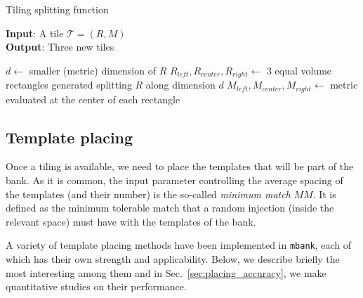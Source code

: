 \documentclass[twocolumn,showpacs,preprintnumbers,nofootinbib,prd,
superscriptaddress,10pt]{revtex4-2}
\begin{document}
\begin{algorithm}[H]
	\centering
	\caption{Tiling splitting function}\label{alg:tiling}
	\flushleft
	\hspace*{\algorithmicindent} \textbf{Input}: A tile $\mathcal{T} = \left(R, M\right)$ \\
	\hspace*{\algorithmicindent} \textbf{Output}: Three new tiles
	\begin{algorithmic}
		\State $d \gets $ smaller (metric) dimension of $R$
		\State $R_{left}, R_{center}, R_{right} \gets $ 3 equal volume rectangles generated splitting $R$ along dimension $d$ 
		\State $M_{left}, M_{center}, M_{right} \gets $ metric evaluated at the center of each rectangle
		\State{}
		\EndProcedure
	\end{algorithmic}
\end{algorithm}


\subsection{Template placing} \label{sec:template_placing}

Once a tiling is available, we need to place the templates that will be part of the bank.
As it is common, the input parameter controlling the average spacing of the templates (and their number) is the so-called {\it minimum match} $MM$. It is defined as the minimum tolerable match that a random injection (inside the relevant space) must have with the templates of the bank.

A variety of template placing methods have been implemented in \texttt{mbank}, each of which has their own strength and applicability.
Below, we describe briefly the most interesting among them and in Sec.~\ref{sec:placing_accuracy}, we make quantitative studies on their performance.
\end{document}
